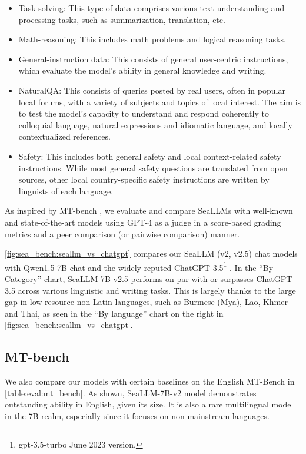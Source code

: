 \begin{itemize}
    \item Task-solving: This type of data comprises various text understanding and processing tasks, such as summarization, translation, etc.
    \item Math-reasoning: This includes math problems and logical reasoning tasks.
    \item General-instruction data: This consists of general user-centric instructions, which evaluate the model's ability in general knowledge and writing.
    \item NaturalQA: This consists of queries posted by real users, often in popular local forums, with a variety of subjects and topics of local interest. The aim is to test the model’s capacity to understand and respond coherently to colloquial language, natural expressions and idiomatic language, and locally contextualized references.
    \item Safety: This includes both general safety and local context-related safety instructions. While most general safety questions are translated from open sources, other local country-specific safety instructions are written by linguists of each language.
\end{itemize}

As inspired by MT-bench \citep{mt_bench_zheng2023judging}, we evaluate and compare SeaLLMs with well-known and state-of-the-art models using GPT-4 as a judge in a score-based grading metrics and a peer comparison (or pairwise comparison) manner. 

\ref{fig:sea_bench:seallm_vs_chatgpt} compares our SeaLLM (v2, v2.5) chat models with Qwen1.5-7B-chat \citep{qwen_bai2023} and the widely reputed ChatGPT-3.5\footnote{gpt-3.5-turbo June 2023 version.} \citep{chatgpt}. In the ``By Category'' chart, SeaLLM-7B-v2.5 performs on par with or surpasses ChatGPT-3.5 across various linguistic and writing tasks. This is largely thanks to the large gap in low-resource non-Latin languages, such as Burmese (Mya), Lao, Khmer and Thai, as seen in the ``By language'' chart on the right in \ref{fig:sea_bench:seallm_vs_chatgpt}. 

\subsection{MT-bench}\label{sec:eval:mt_bench}

We also compare our models with certain baselines on the English MT-Bench \citep{mt_bench_zheng2023judging} in \ref{table:eval:mt_bench}. As shown, SeaLLM-7B-v2 model demonstrates outstanding ability in English, given its size. It is also a rare multilingual model in the 7B realm, especially since it focuses on non-mainstream languages.

